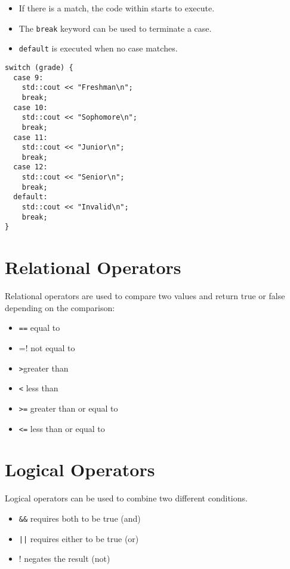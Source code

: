 \begin{itemize}
    \item If there is a match, the code within starts to execute. 
    \item The \verb!break! keyword can be used to terminate a case.
    \item \verb!default! is executed when no case matches.
\end{itemize}

\begin{verbatim}
switch (grade) {
  case 9:
    std::cout << "Freshman\n";
    break;
  case 10:
    std::cout << "Sophomore\n";
    break;
  case 11:
    std::cout << "Junior\n";
    break;
  case 12:
    std::cout << "Senior\n";
    break;
  default:
    std::cout << "Invalid\n";
    break;
}    
\end{verbatim}

\section{Relational Operators}
Relational operators are used to compare two values and return true or
false depending on the comparison:

\begin{itemize}
    \item \verb!==! equal to
    \item \verb!!=! not equal to
    \item \verb!>!greater than
    \item \verb!<! less than
    \item \verb!>=! greater than or equal to
    \item \verb!<=! less than or equal to
\end{itemize}

\section{Logical Operators}
Logical operators can be used to combine two different conditions.

\begin{itemize}
    \item \verb!&&! requires both to be true (and)
    \item \verb!||! requires either to be true (or)
    \item \verb!!! negates the result (not)
\end{itemize}



